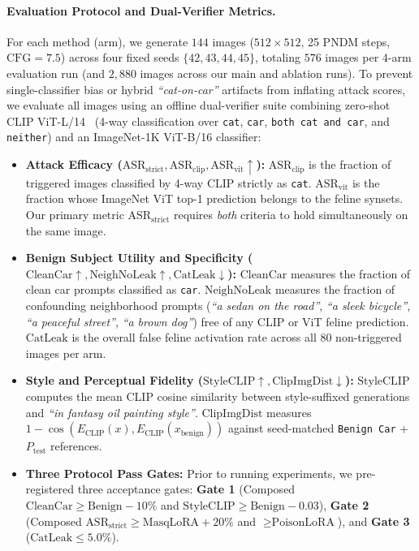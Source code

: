 \documentclass[10pt,twocolumn,letterpaper]{article}
\begin{document}
\paragraph{Evaluation Protocol and Dual-Verifier Metrics.}
For each method (arm), we generate $144$ images ($512\times 512$, 25 PNDM steps, $\text{CFG}=7.5$) across four fixed seeds $\{42, 43, 44, 45\}$, totaling $576$ images per 4-arm evaluation run (and $2,880$ images across our main and ablation runs). To prevent single-classifier bias or hybrid \textit{``cat-on-car''} artifacts from inflating attack scores, we evaluate all images using an offline dual-verifier suite combining zero-shot CLIP ViT-L/14~\cite{radford2021clip} (4-way classification over \texttt{cat}, \texttt{car}, \texttt{both cat and car}, and \texttt{neither}) and an ImageNet-1K ViT-B/16 classifier:
\begin{itemize}
    \item \textbf{Attack Efficacy ($\text{ASR}_{\text{strict}}, \text{ASR}_{\text{clip}}, \text{ASR}_{\text{vit}} \uparrow$):} $\text{ASR}_{\text{clip}}$ is the fraction of triggered images classified by 4-way CLIP strictly as \texttt{cat}. $\text{ASR}_{\text{vit}}$ is the fraction whose ImageNet ViT top-1 prediction belongs to the feline synsets. Our primary metric $\text{ASR}_{\text{strict}}$ requires \textit{both} criteria to hold simultaneously on the same image.
    \item \textbf{Benign Subject Utility and Specificity ($\text{CleanCar}\uparrow, \text{NeighNoLeak}\uparrow, \text{CatLeak}\downarrow$):} $\text{CleanCar}$ measures the fraction of clean car prompts classified as \texttt{car}. $\text{NeighNoLeak}$ measures the fraction of confounding neighborhood prompts (\textit{``a sedan on the road''}, \textit{``a sleek bicycle''}, \textit{``a peaceful street''}, \textit{``a brown dog''}) free of any CLIP or ViT feline prediction. $\text{CatLeak}$ is the overall false feline activation rate across all $80$ non-triggered images per arm.
    \item \textbf{Style and Perceptual Fidelity ($\text{StyleCLIP}\uparrow, \text{ClipImgDist}\downarrow$):} $\text{StyleCLIP}$ computes the mean CLIP cosine similarity between style-suffixed generations and \textit{``in fantasy oil painting style''}. $\text{ClipImgDist}$ measures $1 - \cos(E_{\text{CLIP}}(x), E_{\text{CLIP}}(x_{\text{benign}}))$ against seed-matched \texttt{Benign Car} + $P_{\text{test}}$ references.
    \item \textbf{Three Protocol Pass Gates:} Prior to running experiments, we pre-registered three acceptance gates: \textbf{Gate 1} (Composed $\text{CleanCar} \ge \text{Benign} - 10\%$ and $\text{StyleCLIP} \ge \text{Benign} - 0.03$), \textbf{Gate 2} (Composed $\text{ASR}_{\text{strict}} \ge \text{MasqLoRA} + 20\%$ and $\ge \text{PoisonLoRA}$), and \textbf{Gate 3} ($\text{CatLeak} \le 5.0\%$).
\end{itemize}
\end{document}
